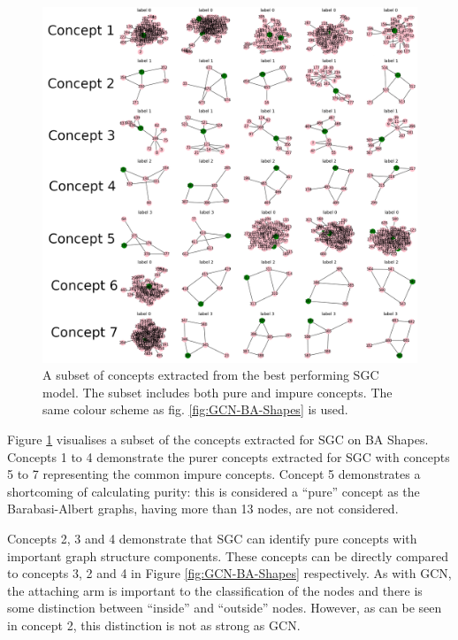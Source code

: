 \begin{figure}
    \centering
    \includegraphics[width=0.4\textheight]{figures/SGC-BA-Shapes}
    \caption{A subset of concepts extracted from the best performing SGC model. The subset includes both pure and impure concepts. The same colour scheme as fig. \ref{fig:GCN-BA-Shapes} is used.}
    \label{fig:SGC-BA-Shapes}
\end{figure}


Figure \ref{fig:SGC-BA-Shapes} visualises a subset of the concepts extracted for SGC on BA Shapes.
Concepts 1 to 4 demonstrate the purer concepts extracted for SGC with concepts 5 to 7 representing the common impure concepts.
Concept 5 demonstrates a shortcoming of calculating purity: this is considered a ``pure'' concept as the Barabasi-Albert graphs, having more than 13 nodes, are not considered. 

Concepts 2, 3 and 4 demonstrate that SGC can identify pure concepts with important graph structure components.
These concepts can be directly compared to concepts 3, 2 and 4 in Figure \ref{fig:GCN-BA-Shapes} respectively.
As with GCN, the attaching arm is important to the classification of the nodes and there is some distinction between ``inside'' and ``outside'' nodes.
However, as can be seen in concept 2, this distinction is not as strong as GCN.

